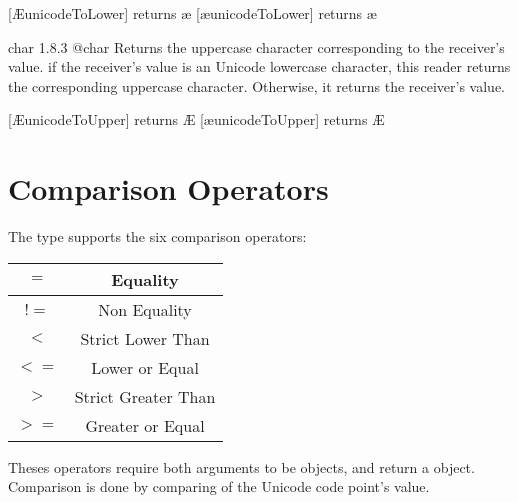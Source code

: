 \exempleDeuxLignes
{}
{[\textquotesingle\AE\textquotesingle unicodeToLower] returns \textquotesingle\ae \textquotesingle}
{[\textquotesingle\ae\textquotesingle unicodeToLower] returns \textquotesingle\ae \textquotesingle}




{char}
{1.8.3}
{@char}
{Returns the uppercase character corresponding to the receiver's value.}
{if the receiver's value is an Unicode lowercase character, this reader returns the corresponding uppercase character. Otherwise, it returns the receiver's value.}

\exempleDeuxLignes
{}
{[\textquotesingle\AE\textquotesingle unicodeToUpper] returns \textquotesingle\AE\textquotesingle}
{[\textquotesingle\ae\textquotesingle unicodeToUpper] returns \textquotesingle\AE\textquotesingle}





\section{Comparison Operators}

The  type supports the six comparison operators:\newline

\begin{tabular}{|c|c|}
\hline
$=$ & Equality \\
\hline
$!=$ & Non Equality \\
\hline
$<$  & Strict Lower Than \\
\hline
$<=$  & Lower or Equal \\
\hline
$>$  & Strict Greater Than \\
\hline
$>=$  & Greater or Equal \\
\hline
\end{tabular}

Theses operators require both arguments to be  objects, and return a  object. Comparison is done by comparing of the Unicode code point's value.


